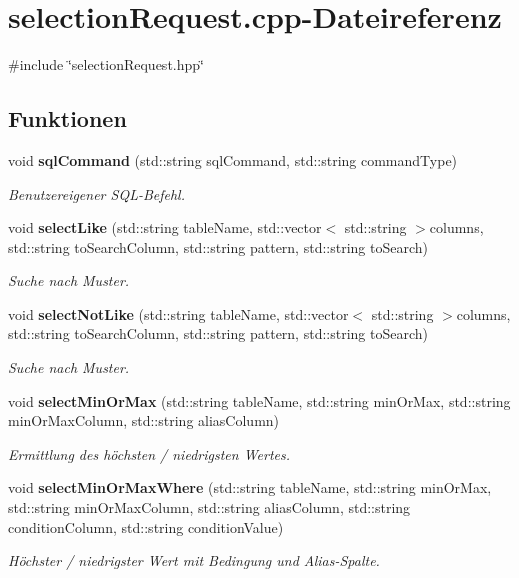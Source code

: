 \section{selection\+Request.\+cpp-\/\+Dateireferenz}
\label{selection_request_8cpp}
{\ttfamily \#include \char`\"{}selection\+Request.\+hpp\char`\"{}}\newline
\subsection*{Funktionen}
\begin{DoxyCompactItemize}
\item 
void \textbf{ sql\+Command} (std\+::string sql\+Command, std\+::string command\+Type)
\begin{DoxyCompactList}\small\item\em Benutzereigener S\+Q\+L-\/\+Befehl. \end{DoxyCompactList}\item 
void \textbf{ select\+Like} (std\+::string table\+Name, std\+::vector$<$ std\+::string $>$columns, std\+::string to\+Search\+Column, std\+::string pattern, std\+::string to\+Search)
\begin{DoxyCompactList}\small\item\em Suche nach Muster. \end{DoxyCompactList}\item 
void \textbf{ select\+Not\+Like} (std\+::string table\+Name, std\+::vector$<$ std\+::string $>$columns, std\+::string to\+Search\+Column, std\+::string pattern, std\+::string to\+Search)
\begin{DoxyCompactList}\small\item\em Suche nach Muster. \end{DoxyCompactList}\item 
void \textbf{ select\+Min\+Or\+Max} (std\+::string table\+Name, std\+::string min\+Or\+Max, std\+::string min\+Or\+Max\+Column, std\+::string alias\+Column)
\begin{DoxyCompactList}\small\item\em Ermittlung des höchsten / niedrigsten Wertes. \end{DoxyCompactList}\item 
void \textbf{ select\+Min\+Or\+Max\+Where} (std\+::string table\+Name, std\+::string min\+Or\+Max, std\+::string min\+Or\+Max\+Column, std\+::string alias\+Column, std\+::string condition\+Column, std\+::string condition\+Value)
\begin{DoxyCompactList}\small\item\em Höchster / niedrigster Wert mit Bedingung und Alias-\/\+Spalte. \end{DoxyCompactList}\item 

\end{DoxyCompactItemize}
